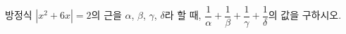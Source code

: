 방정식 $|x^2+6x|=2$의 근을 $\alpha$, $\beta$, $\gamma$, $\delta$라 할 때, $\dfrac{1}{\alpha}+\dfrac{1}{\beta}+\dfrac{1}{\gamma}+\dfrac{1}{\delta}$의 값을 구하시오.
